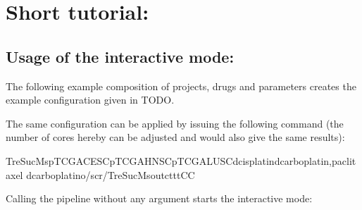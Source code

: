 \documentclass[letterpaper,10pt,english]{sphinxmanual}
\begin{document}
\chapter{Short tutorial:}
\label{\detokenize{index:short-tutorial}}

\section{Usage of the interactive mode:}
\label{\detokenize{index:usage-of-the-interactive-mode}}
\sphinxAtStartPar
The following example composition of projects, drugs and parameters creates the
example configuration given in TODO.

\sphinxAtStartPar
The same configuration can be applied by issuing the following command (the
number of cores hereby can be adjusted and would also give the same results):

\begin{sphinxVerbatim}[commandchars=\\\{\}]
\PYGZdl{}TreSucMs\PYGZhy{}pTCGA\PYGZhy{}CESC\PYGZhy{}pTCGA\PYGZhy{}HNSC\PYGZhy{}pTCGA\PYGZhy{}LUSC\PYGZhy{}dcisplatin\PYGZhy{}dcarboplatin,paclitaxel
\PYGZhy{}dcarboplatin\PYGZhy{}o/scr/TreSucMs\PYGZus{}out\PYGZhy{}c\PYGZhy{}t\PYGZhy{}t\PYGZhy{}t\PYGZhy{}C\PYGZhy{}C
\end{sphinxVerbatim}

\sphinxAtStartPar
Calling the pipeline without any argument starts the interactive mode:
\end{document}
